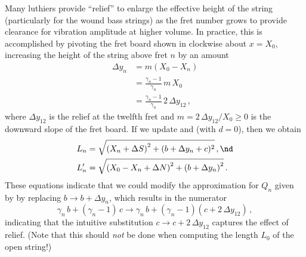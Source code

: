 Many luthiers provide ``relief'' to enlarge the effective height of the string (particularly for the wound bass strings) as the fret number grows to provide clearance for vibration amplitude at higher volume. In practice, this is accomplished by pivoting the fret board shown in  clockwise about $x = X_0$, increasing the height of the string above fret $n$  by an amount
\begin{equation}
  \begin{split}
    \Delta y_n &= m \left(X_0 - X_n\right) \\
    &= \frac{\gamma_n - 1}{\gamma_n}\, m\, X_0 \\
    &= \frac{\gamma_n - 1}{\gamma_n}\, 2\, \Delta y_{12}\, ,
  \end{split}
\end{equation}
where $\Delta y_{12}$ is the relief at the twelfth fret and $m = 2\, \Delta y_{12} / X_0 \ge 0$ is the downward slope of the fret board. If we update  and  (with $d = 0$), then we obtain
\begin{subequations}
  \begin{align}
    L_n &= \sqrt{\left(X_n + \Delta S\right)^2 + (b + \Delta y_n + c)^2}\, , \nd \\
    L^\prime_n &= \sqrt{\left(X_0 - X_n + \Delta N\right)^2 + \left(b + \Delta y_n\right)^2}\, .
  \end{align}
\end{subequations}
These equations indicate that we could modify the approximation for $Q_n$ given by  by replacing $b \longrightarrow b + \Delta y_n$, which results in the numerator
\begin{equation}
  \gamma_n\, b + (\gamma_n - 1)\, c \longrightarrow \gamma_n\, b + (\gamma_n - 1) \left(c + 2\, \Delta y_{12}\right)\, ,
\end{equation}
indicating that the intuitive substitution $c \longrightarrow c + 2\, \Delta y_{12}$ captures the effect of relief. (Note that this should \emph{not} be done when computing the length $L_0$ of the open string!)


